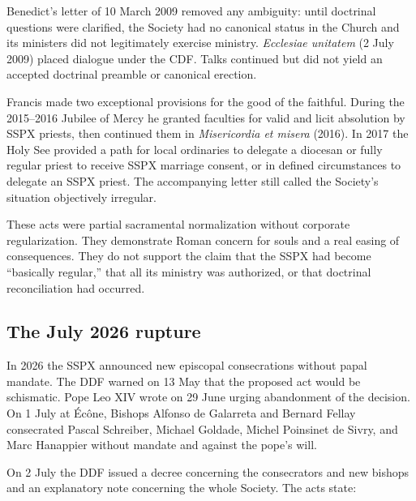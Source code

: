 Benedict's letter of 10 March 2009 removed any ambiguity: until doctrinal questions were clarified, the Society had no canonical status in the Church and its ministers did not legitimately exercise ministry. \emph{Ecclesiae unitatem} (2 July 2009) placed dialogue under the CDF. Talks continued but did not yield an accepted doctrinal preamble or canonical erection.

Francis made two exceptional provisions for the good of the faithful. During the 2015--2016 Jubilee of Mercy he granted faculties for valid and licit absolution by SSPX priests, then continued them in \emph{Misericordia et misera} (2016). In 2017 the Holy See provided a path for local ordinaries to delegate a diocesan or fully regular priest to receive SSPX marriage consent, or in defined circumstances to delegate an SSPX priest. The accompanying letter still called the Society's situation objectively irregular.

These acts were partial sacramental normalization without corporate regularization. They demonstrate Roman concern for souls and a real easing of consequences. They do not support the claim that the SSPX had become “basically regular,” that all its ministry was authorized, or that doctrinal reconciliation had occurred.

\subsection{The July 2026 rupture}

In 2026 the SSPX announced new episcopal consecrations without papal mandate. The DDF warned on 13 May that the proposed act would be schismatic. Pope Leo XIV wrote on 29 June urging abandonment of the decision. On 1 July at Écône, Bishops Alfonso de Galarreta and Bernard Fellay consecrated Pascal Schreiber, Michael Goldade, Michel Poinsinet de Sivry, and Marc Hanappier without mandate and against the pope's will.

On 2 July the DDF issued a decree concerning the consecrators and new bishops and an explanatory note concerning the whole Society. The acts state:

